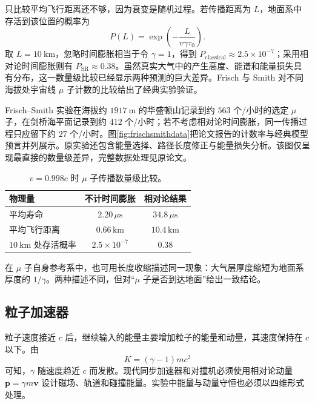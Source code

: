 \documentclass[style=classic,color=full]{lc-article}
\begin{document}
只比较平均飞行距离还不够，因为衰变是随机过程。若传播距离为 $L$，地面系中存活到该位置的概率为
\begin{equation}
  P(L)=\exp\left(-\frac{L}{v\gamma\tau_0}\right).
  \label{eq:muonsurvival}
\end{equation}
取 $L=\SI{10}{\kilo\metre}$，忽略时间膨胀相当于令 $\gamma=1$，得到 $P_{\mathrm{classical}}\approx2.5\times10^{-7}$；采用相对论时间膨胀则有 $P_{\mathrm{SR}}\approx0.38$。虽然真实大气中的产生高度、能谱和能量损失具有分布，这一数量级比较已经显示两种预测的巨大差异。Frisch 与 Smith 对不同海拔处宇宙线 $\mu$ 子计数的比较给出了经典实验验证\cite{frischsmith1963}。

Frisch--Smith 实验在海拔约 $\SI{1917}{\metre}$ 的华盛顿山记录到约 $563$ 个/小时的选定 $\mu$ 子，在剑桥海平面记录到约 $412$ 个/小时；若不考虑相对论时间膨胀，同一传播过程只应留下约 $27$ 个/小时。图\ref{fig:frischsmithdata}把论文报告的计数率与经典模型预言并列展示。原实验还包含能量选择、路径长度修正与能量损失分析。该图仅呈现最直接的数量级差异，完整数据处理见原论文。


\begin{table}[htbp]
  \centering
  \caption{$v=0.998c$ 时 $\mu$ 子传播数量级比较。}
  \label{tab:muon}
  \begin{tabular}{>{\centering\arraybackslash}p{4.2cm}cc}
    \toprule
    物理量 & 不计时间膨胀 & 相对论结果 \\
    \midrule
    平均寿命 & $2.20\,\mu\mathrm{s}$ & $34.8\,\mu\mathrm{s}$ \\
    平均飞行距离 & $0.66\,\mathrm{km}$ & $10.4\,\mathrm{km}$ \\
    $\SI{10}{\kilo\metre}$ 处存活概率 & $2.5\times10^{-7}$ & $0.38$ \\
    \bottomrule
  \end{tabular}
\end{table}

在 $\mu$ 子自身参考系中，也可用长度收缩描述同一现象：大气层厚度缩短为地面系厚度的 $1/\gamma$。两种描述不同，但对“$\mu$ 子是否到达地面”给出一致结论。

\subsection{粒子加速器}

粒子速度接近 $c$ 后，继续输入的能量主要增加粒子的能量和动量，其速度保持在 $c$ 以下。由
\begin{equation}
  K=(\gamma-1)mc^2
\end{equation}
可知，$\gamma$ 随速度趋近 $c$ 而发散。现代同步加速器和对撞机必须使用相对论动量 $\bm p=\gamma m\bm v$ 设计磁场、轨道和碰撞能量。实验中能量与动量守恒也必须以四维形式处理\cite{pdg2024}。
\end{document}
